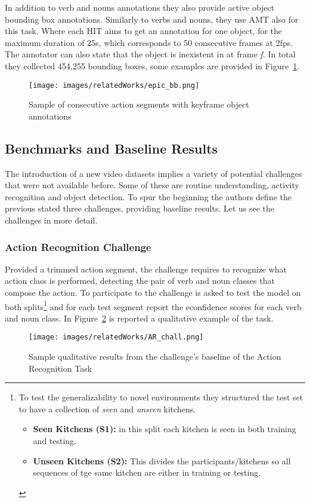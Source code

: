 In addition to verb and nouns annotations they also provide active object bounding box annotations.
Similarly to verbs and nouns, they use AMT also for this task. Where each HIT aims to 
get an annotation for one object, for the maximum duration of 25s, which corresponds
to 50 consecutive frames at 2fps. The annotator can also state that the object is inexistent
in at frame \textit{f}. In total they collected 454,255 bounding boxes, some examples
are provided in Figure~\ref{fig:epic_bb}.
\begin{figure}[t]
    \centering
    \texttt{[image: images/relatedWorks/epic\_bb.png]} 
    \caption{Sample of consecutive action segments with keyframe object annotations}\label{fig:epic_bb}
\end{figure}


\subsection{Benchmarks and Baseline Results}
The introduction of a new video datasets implies a variety of potential challenges
that were not available before. Some of these are routine understanding, activity
recognition and object detection. To spur the beginning the authors define 
the previous stated three challenges, providing baseline results.
Let us see the challenges in more detail.

\subsubsection{Action Recognition Challenge} \label{sec:ep_AR_chall}
Provided a trimmed action segment, the challenge requires to recognize
what action class is performed, detecting the pair of verb and noun classes that 
compose the action. To participate to the challenge is asked to test the model
on both splits\footnote{ To test the generalizability to novel environments they 
structured the test set to have a collection of \textit{seen} and \textit{unseen}
kitchens.
\begin{itemize}
    \item \textbf{Seen Kitchens (S1):} in this split each kitchen is seen in both training and testing.
    \item \textbf{Unseen Kitchens (S2):} This divides the participants/kitchens so all sequences
     of tge same kitchen are either in training or testing.
\end{itemize}
} and for each test segment report the econfidence 
scores for each verb and noun class. In Figure~\ref{fig:epic_ar_chall} is reported
a qualitative example of the task.
\begin{figure}[t]
    \centering
    \texttt{[image: images/relatedWorks/AR\_chall.png]} 
    \caption{Sample qualitative results from the challenge's baseline of the Action Recognition Task}\label{fig:epic_ar_chall}
\end{figure}


